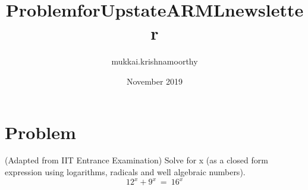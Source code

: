 \documentclass{article}
\title{ProblemforUpstateARMLnewsletter}
\author{mukkai.krishnamoorthy }
\date{November 2019}
\begin{document}
\maketitle

\section{Problem}
(Adapted from IIT Entrance Examination)
Solve for x (as a closed form expression using logarithms, radicals and well algebraic numbers).
\begin{equation}
    {12}^x+9^x~=~{16}^x 
\end{equation}
\end{document}
